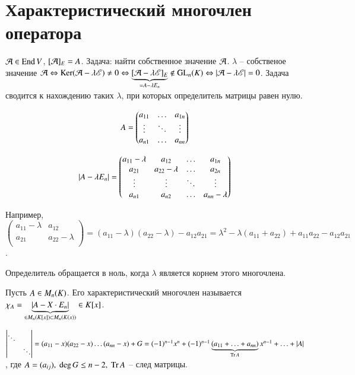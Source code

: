 \documentclass[main]{subfiles}
\begin{document}
\chapter{Характеристический многочлен оператора}

$\mathcal{A} \in \operatorname{End} V$, $[\mathcal{A}]_E = A$.
Задача: найти собственное значение $\mathcal{A}$.
$\lambda$ -- собственое значение $\mathcal{A} \Leftrightarrow
    \operatorname{Ker}(\mathcal{A} - \lambda\mathscr{E}) \neq 0 \Leftrightarrow
    \underbrace{[\mathcal{A} - \lambda\mathscr{E}]_E}_{=A-\lambda E_n} \not\in \operatorname{GL}_n(K) \Leftrightarrow |\mathcal{A} - \lambda\mathscr{E}| = 0$. Задача сводится к нахождению таких
$\lambda$, при которых определитель матрицы равен нулю.


\[A = \begin{pmatrix}
        a_{11} & \ldots & a_{1n} \\
        \vdots & \ddots & \vdots \\
        a_{n1} & \ldots & a_{nn} \\
    \end{pmatrix}\]

\[|A - \lambda E_n| = \begin{pmatrix}
        a_{11} - \lambda & a_{12}           & \ldots & a_{1n}           \\
        a_{21}           & a_{22} - \lambda & \ldots & a_{2n}           \\
        \vdots           & \vdots           & \ddots & \vdots           \\
        a_{n1}           & a_{n2}           & \ldots & a_{nn} - \lambda \\
    \end{pmatrix}\]


Например, $\begin{pmatrix}
        a_{11} - \lambda & a_{12}           \\
        a_{21}           & a_{22} - \lambda \\
    \end{pmatrix} = (a_{11} - \lambda)(a_{22} - \lambda) - a_{12} a_{21} =
    \lambda ^2 - \lambda(a_{11}+a_{22}) + a_{11}a_{22} - a_{12} a_{21}$.

Определитель обращается в ноль, когда $\lambda$
является корнем этого многочлена.

\begin{definition} 
    Пусть $A \in M_n(K)$. Его характеристический многочлен называется
    $\chi_A = \underbrace{|A - X\cdot E_n|}_{\in M_n(K[x])\subset M_n(K(x))} \in K[x]$.

    $\begin{vmatrix}
            \ddots &        \\
                   & \ddots \\
        \end{vmatrix} = (a_{11} - x)(a_{22} - x)\ldots(a_{nn} - x) + G =
        (-1)^{n-1}x^n+(-1)^{n-1}\underbrace{(a_{11}+\ldots+a_{nn})}_{\operatorname{Tr}A}x^{n-1}+\ldots+|A|$,
    где $\A= (a_{ij}),\ \deg G \leq n-2,\ \Tr\A$ -- след матрицы.
\end{definition}
\end{document}

